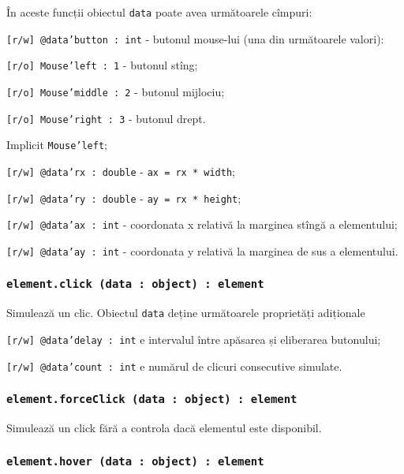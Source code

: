 În aceste funcții obiectul \texttt{data} poate avea următoarele cîmpuri:
\begin{icItems}
    \item \texttt{[r/w] @data'button : int} - butonul mouse-lui (una din următoarele valori):
	\begin{icItems}
	    \item \texttt{[r/o] Mouse'left : 1} - butonul stîng;
		\item \texttt{[r/o] Mouse'middle : 2} - butonul mijlociu;
		\item \texttt{[r/o] Mouse'right : 3} - butonul drept.
	\end{icItems}
	Implicit \texttt{Mouse'left};
	\item \texttt{[r/w] @data'rx : double} - \texttt{ax = rx * width};
	\item \texttt{[r/w] @data'ry : double} - \texttt{ay = rx * height};
	\item \texttt{[r/w] @data'ax : int} - coordonata x relativă la marginea stîngă a elementului;
	\item \texttt{[r/w] @data'ay : int} - coordonata y relativă la marginea de sus a elementului.
\end{icItems}

\subsubsection{\texttt{element.click (data : object) : element}}

Simulează un clic. Obiectul \texttt{data} deține următoarele proprietăți adiționale
\begin{icItems}
	\item \texttt{[r/w] @data'delay : int} e intervalul între apăsarea și eliberarea butonului;
	\item \texttt{[r/w] @data'count : int} e numărul de clicuri consecutive simulate.
\end{icItems}

\subsubsection{\texttt{element.forceClick (data : object) : element}}

Simulează un click fără a controla dacă elementul este disponibil.

\subsubsection{\texttt{element.hover (data : object) : element}}

